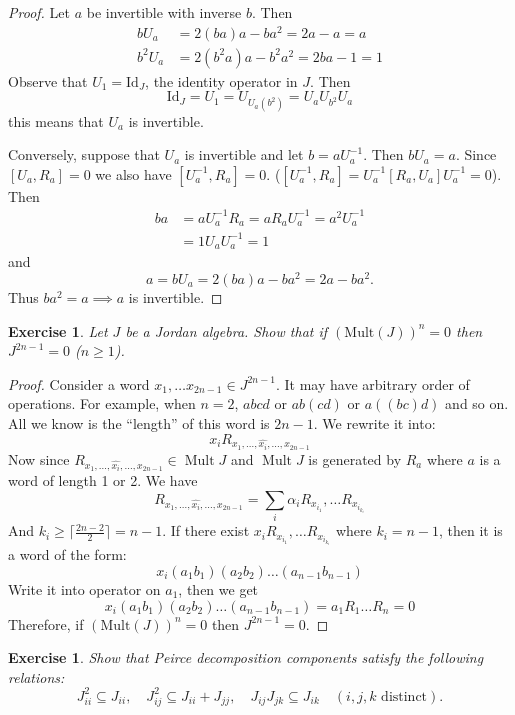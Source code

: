\documentclass{article}
\newtheorem{exercise}[theorem]{Exercise}
\begin{document}
\begin{proof} 
Let $a$ be invertible with inverse $b$. Then  
\begin{align*}  
 bU_a &= 2(ba)a - ba^2 = 2a-a=a \\
 b^2U_a &= 2(b^2a)a - b^2a^2 = 2ba-1 = 1  
\end{align*}  
Observe that $U_1 = \text{Id}_J$, the identity operator in $J$. Then  
\[ \text{Id}_J = U_1 =U_{U_a(b^2)} = U_a U_{b^2} U_a \]  
this means that $U_a$ is invertible. 

Conversely, suppose that $U_a$ is invertible and let $b = a U_a^{-1}$. Then $b U_a = a$.  
Since $[U_a, R_a]=0$ we also have $[U_a^{-1}, R_a]=0$. ($ [U_a^{-1}, R_a]=U_a^{-1}[R_a, U_a] U_a^{-1}=0$). Then  
\begin{align*}  
    ba &= a U_a^{-1} R_a = a R_a U_a^{-1} = a^2 U_a^{-1} \\
       &= 1 U_a U_a^{-1} = 1  
\end{align*}  
and  
\[ a = b U_a = 2(ba)a - ba^2 = 2a - ba^2. \]  
Thus $ba^2=a \implies a$ is invertible.  
\end{proof}

\begin{exercise}
Let $J$ be a Jordan algebra. Show that if $(\text{Mult}(J))^n = 0$ then $J^{2n-1} = 0$ ($ n \ge 1 $).  
\end{exercise}

\begin{proof}
Consider a word $ x_1, \ldots x_{2n-1} \in J^{2n-1} $. It may have arbitrary order of operations. For example, when $ n=2 $, $ abcd $ or $ ab(cd) $ or $ a((bc)d) $ and so on. All we know is the ``length'' of this word is $ 2n-1 $. We rewrite it into:
\[
x_i R_{x_1, \ldots , \hat{x_i}, \ldots, x_{2n-1}}
\]      
Now since $R_{x_1, \ldots , \hat{x_i}, \ldots, x_{2n-1}} \in \operatorname{Mult}J  $ and $  \operatorname{Mult}J  $ is generated by $ R_a $ where $ a $ is a word of length 1 or 2. We have 
\[
R_{x_1, \ldots , \hat{x_i}, \ldots, x_{2n-1}}=\sum_i \alpha_i R_{x_{i_1}}, \ldots R_{x_{i_{k_i}}}
\]    
And $ k_i \ge \lceil\frac{2n-2}{2}\rceil=n-1 $. If there exist $ x_i R_{x_{i_1}}, \ldots R_{x_{i_{k_i}}}$ where $ k_i=n-1 $, then it is a word of the form:
\[
x_i(a_1b_1)(a_2b_2) \ldots (a_{n-1}b_{n-1})
\]
Write it into operator on $ a_1 $, then we get
\[
x_i(a_1b_1)(a_2b_2) \ldots (a_{n-1}b_{n-1})=a_1R_1 \ldots R_n=0
\]  
Therefore, if $(\text{Mult}(J))^n = 0$ then $J^{2n-1} = 0$.  
\end{proof}

\begin{exercise}
Show that Peirce decomposition components satisfy the following relations:  
    \[ J_{ii}^2 \subseteq J_{ii}, \quad J_{ij}^2 \subseteq J_{ii} + J_{jj}, \quad J_{ij}J_{jk} \subseteq J_{ik} \quad (i, j, k \text{ distinct}). \]  
\end{exercise}
\end{document}
